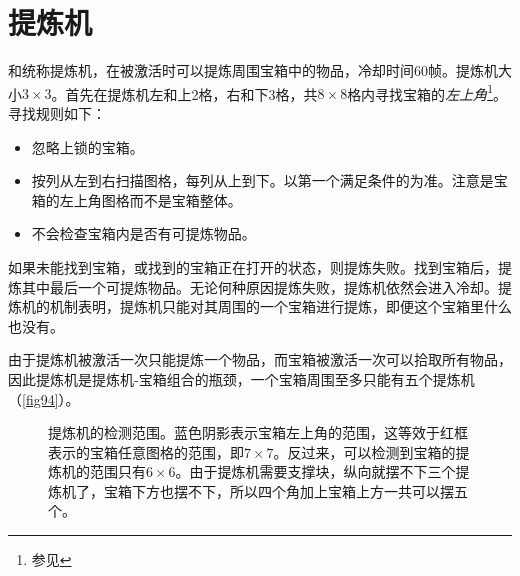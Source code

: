 \section{提炼机}\label{sec:extractinator}
\begin{center}
  \qquad
\end{center}

和统称提炼机，在被激活时可以提炼周围宝箱中的物品，冷却时间60帧。提炼机大小$3\times 3$。首先在提炼机左和上2格，右和下3格，共$8\times 8$格内寻找宝箱的\emph{左上角}\footnote{参见}。寻找规则如下：
\begin{itemize}
  \item 忽略上锁的宝箱。
  \item 按列从左到右扫描图格，每列从上到下。以第一个满足条件的为准。注意是宝箱的左上角图格而不是宝箱整体。
  \item 不会检查宝箱内是否有可提炼物品。
\end{itemize}
如果未能找到宝箱，或找到的宝箱正在打开的状态，则提炼失败。找到宝箱后，提炼其中最后一个可提炼物品。无论何种原因提炼失败，提炼机依然会进入冷却。提炼机的机制表明，提炼机只能对其周围的一个宝箱进行提炼，即便这个宝箱里什么也没有。

由于提炼机被激活一次只能提炼一个物品，而宝箱被激活一次可以拾取所有物品，因此提炼机是提炼机-宝箱组合的瓶颈，一个宝箱周围至多只能有五个提炼机（\autoref{fig94}）。

\begin{figure}[!ht]
  \centering
  \caption{提炼机的检测范围。\protect{}蓝色阴影表示宝箱左上角的范围，这等效于红框表示的宝箱任意图格的范围，即$7\times 7$。\protect{}反过来，可以检测到宝箱的提炼机的范围只有$6\times 6$。由于提炼机需要支撑块，纵向就摆不下三个提炼机了，宝箱下方也摆不下，所以四个角加上宝箱上方一共可以摆五个。}\label{fig94}
\end{figure}

